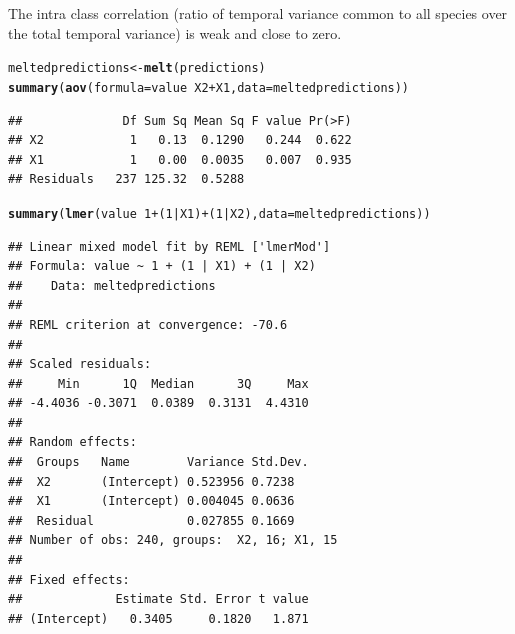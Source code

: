 \documentclass[a4paper, 10pt]{scrartcl}\usepackage[]{graphicx}\usepackage[]{color}
\makeatletter
\newcommand{\hlnum}[1]{\textcolor[rgb]{0.686,0.059,0.569}{#1}}%
\newcommand{\hlopt}[1]{\textcolor[rgb]{0,0,0}{#1}}%
\newcommand{\hlstd}[1]{\textcolor[rgb]{0.345,0.345,0.345}{#1}}%
\newcommand{\hlkwb}[1]{\textcolor[rgb]{0.69,0.353,0.396}{#1}}%
\newcommand{\hlkwc}[1]{\textcolor[rgb]{0.333,0.667,0.333}{#1}}%
\newcommand{\hlkwd}[1]{\textcolor[rgb]{0.737,0.353,0.396}{\textbf{#1}}}%
\newenvironment{kframe}{%
 \def\at@end@of@kframe{}%
 \ifinner\ifhmode%
  \def\at@end@of@kframe{\end{minipage}}%
  \begin{minipage}{\columnwidth}%
 \fi\fi%
 \def\FrameCommand##1{\hskip\@totalleftmargin \hskip-\fboxsep
 \colorbox{shadecolor}{##1}\hskip-\fboxsep
     \hskip-\linewidth \hskip-\@totalleftmargin \hskip\columnwidth}%
 \MakeFramed {\advance\hsize-\width
   \@totalleftmargin\z@ \linewidth\hsize
   \@setminipage}}%
 {\par\unskip\endMakeFramed%
 \at@end@of@kframe}
\newenvironment{knitrout}{}{} %
\makeatother
\begin{document}
The intra class correlation (ratio of temporal variance common to all species over the total temporal variance) is weak and close to zero.
\begin{knitrout}
\color{fgcolor}\begin{kframe}
\begin{alltt}
\hlstd{meltedpredictions} \hlkwb{<-} \hlkwd{melt}\hlstd{(predictions)}
\hlkwd{summary}\hlstd{(}\hlkwd{aov}\hlstd{(}\hlkwc{formula} \hlstd{= value} \hlopt{~} \hlstd{X2} \hlopt{+} \hlstd{X1,} \hlkwc{data}\hlstd{=meltedpredictions))}
\end{alltt}
\begin{verbatim}
##              Df Sum Sq Mean Sq F value Pr(>F)
## X2            1   0.13  0.1290   0.244  0.622
## X1            1   0.00  0.0035   0.007  0.935
## Residuals   237 125.32  0.5288
\end{verbatim}
\begin{alltt}
\hlkwd{summary}\hlstd{(}\hlkwd{lmer}\hlstd{(value} \hlopt{~} \hlnum{1} \hlopt{+} \hlstd{(}\hlnum{1}\hlopt{|}\hlstd{X1)}\hlopt{+} \hlstd{(}\hlnum{1}\hlopt{|}\hlstd{X2),} \hlkwc{data}\hlstd{=meltedpredictions))}
\end{alltt}
\begin{verbatim}
## Linear mixed model fit by REML ['lmerMod']
## Formula: value ~ 1 + (1 | X1) + (1 | X2)
##    Data: meltedpredictions
## 
## REML criterion at convergence: -70.6
## 
## Scaled residuals: 
##     Min      1Q  Median      3Q     Max 
## -4.4036 -0.3071  0.0389  0.3131  4.4310 
## 
## Random effects:
##  Groups   Name        Variance Std.Dev.
##  X2       (Intercept) 0.523956 0.7238  
##  X1       (Intercept) 0.004045 0.0636  
##  Residual             0.027855 0.1669  
## Number of obs: 240, groups:  X2, 16; X1, 15
## 
## Fixed effects:
##             Estimate Std. Error t value
## (Intercept)   0.3405     0.1820   1.871
\end{verbatim}
\end{kframe}
\end{knitrout}
\end{document}

